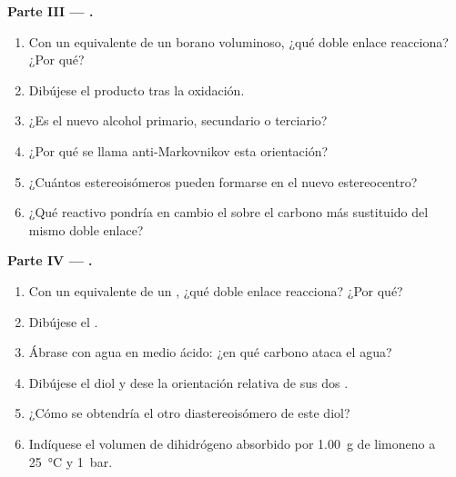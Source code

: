 \begin{problem}
\medskip
\noindent\textbf{Parte III --- .}
\begin{enumerate}[resume]
  \item Con un equivalente de un borano voluminoso, ¿qué doble enlace reacciona? ¿Por qué?
  \item Dibújese el producto tras la oxidación.
  \item ¿Es el nuevo alcohol primario, secundario o terciario?
  \item ¿Por qué se llama anti-Markovnikov esta orientación?
  \item ¿Cuántos estereoisómeros pueden formarse en el nuevo estereocentro?
  \item ¿Qué reactivo pondría en cambio el  sobre el carbono más sustituido del
        mismo doble enlace?
\end{enumerate}

\medskip
\noindent\textbf{Parte IV --- .}
\begin{enumerate}[resume]
  \item Con un equivalente de un , ¿qué doble enlace reacciona? ¿Por qué?
  \item Dibújese el .
  \item Ábrase con agua en medio ácido: ¿en qué carbono ataca el agua?
  \item Dibújese el diol y dese la orientación relativa de sus dos .
  \item ¿Cómo se obtendría el otro diastereoisómero de este diol?
  \item Indíquese el volumen de dihidrógeno absorbido por \qty{1.00}{g} de limoneno a
        \qty{25}{\degreeCelsius} y \qty{1}{bar}.
\end{enumerate}
\end{problem}
